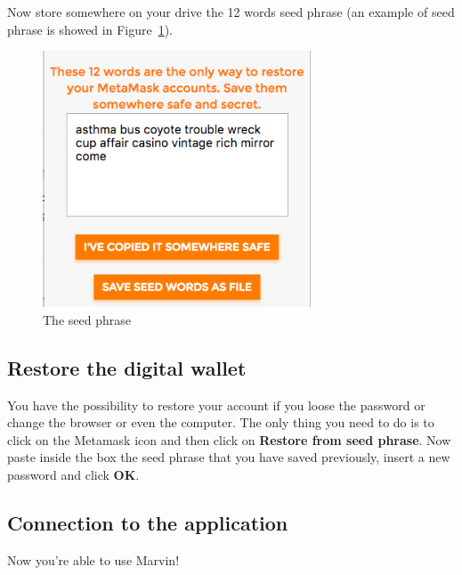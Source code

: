 Now store somewhere on your drive the 12 words seed phrase (an example of seed phrase is showed in Figure~\ref{fig:seed}).
\begin{figure}[!h]
	\centering
	\includegraphics[height=3in]{img/seed.png}
	\caption{The seed phrase}
	\label{fig:seed}
\end{figure}


\subsection{Restore the digital wallet}
You have the possibility to restore your account if you loose the password or change the browser or even the computer. The only thing you need to do is to click on the Metamask icon and then click on \textbf{Restore from seed phrase}. Now paste inside the box the seed phrase that you have saved previously, insert a new password and click \textbf{OK}.

\subsection{Connection to the application}
\WarningSubsection{}

Now you're able to use Marvin!